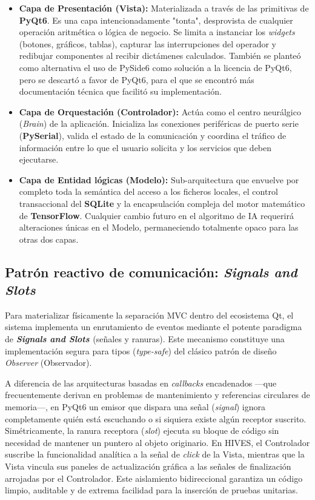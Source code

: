 \begin{itemize}
    \item \textbf{Capa de Presentación (Vista):} Materializada a través de las primitivas de \textbf{PyQt6}. Es una capa intencionadamente "tonta", desprovista de cualquier operación aritmética o lógica de negocio. Se limita a instanciar los \textit{widgets} (botones, gráficos, tablas), capturar las interrupciones del operador y redibujar componentes al recibir dictámenes calculados. También se planteó como alternativa el uso de PySide6 como solución a la licencia de PyQt6, pero se descartó a favor de PyQt6, para el que se encontró más documentación técnica  que facilitó su implementación.
    \item \textbf{Capa de Orquestación (Controlador):} Actúa como el centro neurálgico (\textit{Brain}) de la aplicación. Inicializa las conexiones periféricas de puerto serie (\textbf{PySerial}), valida el estado de la comunicación y coordina el tráfico de información entre lo que el usuario solicita y los servicios que deben ejecutarse.
    \item \textbf{Capa de Entidad lógicas (Modelo):} Sub-arquitectura que envuelve por completo toda la semántica del acceso a los ficheros locales, el control transaccional del \textbf{SQLite} y la encapsulación compleja del motor matemático de \textbf{TensorFlow}. Cualquier cambio futuro en el algoritmo de IA requerirá alteraciones únicas en el Modelo, permaneciendo totalmente opaco para las otras dos capas.
\end{itemize}

\subsection*{Patrón reactivo de comunicación: \textit{Signals and Slots}}

Para materializar físicamente la separación MVC dentro del ecosistema Qt, el sistema implementa un enrutamiento de eventos mediante el potente paradigma de \textbf{\textit{Signals and Slots \cite{pyqt6signals2024}}} (señales y ranuras). Este mecanismo constituye una implementación segura para tipos (\textit{type-safe}) del clásico patrón de diseño \textit{Observer} (Observador).

A diferencia de las arquitecturas basadas en \textit{callbacks} encadenados ---que frecuentemente derivan en problemas de mantenimiento y referencias circulares de memoria---, en PyQt6 un emisor que dispara una señal (\textit{signal}) ignora completamente quién está escuchando o si siquiera existe algún receptor suscrito. Simétricamente, la ranura receptora (\textit{slot}) ejecuta su bloque de código sin necesidad de mantener un puntero al objeto originario. En HIVES, el Controlador suscribe la funcionalidad analítica a la señal de \textit{click} de la Vista, mientras que la Vista vincula sus paneles de actualización gráfica a las señales de finalización arrojadas por el Controlador. Este aislamiento bidireccional garantiza un código limpio, auditable y de extrema facilidad para la inserción de pruebas unitarias.

